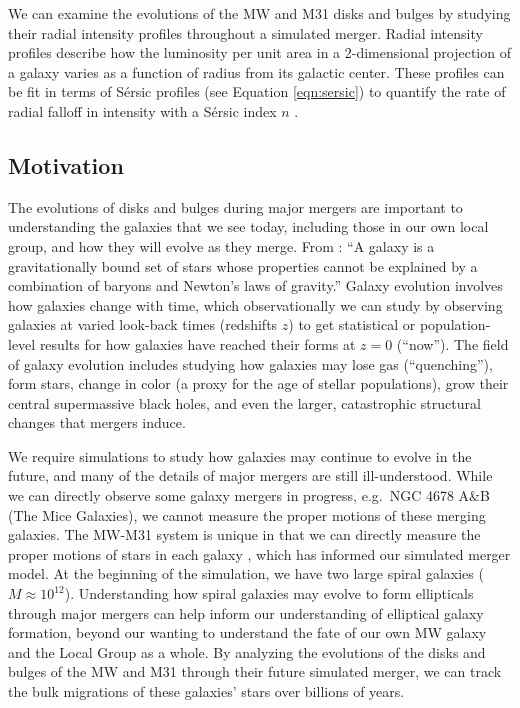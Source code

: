 \documentclass[twocolumn]{aastex631}
\begin{document}
 We can examine the evolutions of the MW and M31 disks and bulges by studying their radial intensity profiles throughout a simulated merger. Radial intensity profiles describe how the luminosity per unit area in a 2-dimensional projection of a galaxy varies as a function of radius from its galactic center. These profiles can be fit in terms of S\'{e}rsic profiles (see Equation \ref{eqn:sersic}) to quantify the rate of radial falloff in intensity with a S\'ersic index $n$ \citep{sersic1963, sersic1968}.

\subsection{Motivation}
The evolutions of disks and bulges during major mergers are important to understanding the galaxies that we see today, including those in our own local group, and how they will evolve as they merge. From \cite{willman2012}: ``A galaxy is a gravitationally bound set of stars whose properties cannot be explained by a combination of baryons and Newton's laws of gravity.'' Galaxy evolution involves how galaxies change with time, which observationally we can study by observing galaxies at varied look-back times (redshifts $z$) to get statistical or population-level results for how galaxies have reached their forms at $z=0$ (``now''). The field of galaxy evolution includes studying how galaxies may lose gas (``quenching''), form stars, change in color (a proxy for the age of stellar populations), grow their central supermassive black holes, and even the larger, catastrophic structural changes that mergers induce.

We require simulations to study how galaxies may continue to evolve in the future, and many of the details of major mergers are still ill-understood. While we can directly observe some galaxy mergers in progress, e.g.~NGC 4678 A\&B (The Mice Galaxies), we cannot measure the proper motions of these merging galaxies. The MW-M31 system is unique in that we can directly measure the proper motions of stars in each galaxy \citep{paper1}, which has informed our simulated merger model. At the beginning of the simulation, we have two large spiral galaxies ($M \approx 10^{12}$). Understanding how spiral galaxies may evolve to form ellipticals through major mergers can help inform our understanding of elliptical galaxy formation, beyond our wanting to understand the fate of our own MW galaxy and the Local Group as a whole. By analyzing the evolutions of the disks and bulges of the MW and M31 through their future simulated merger, we can track the bulk migrations of these galaxies' stars over billions of years.
\end{document}
